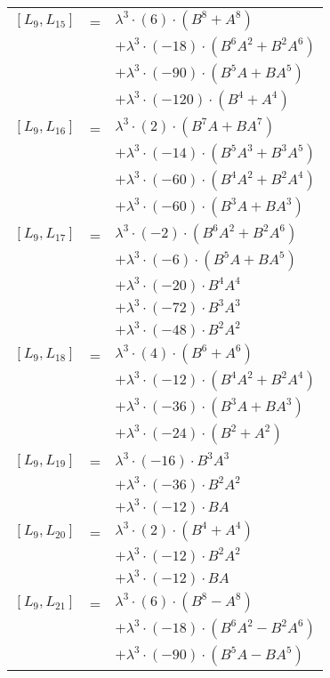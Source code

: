 \documentclass{article}
\begin{document}
\begin{center}
\begin{longtable}{lll}
$[L_{9},L_{15}]$ & = & ${\lambda}^3{\cdot}(6){\cdot}(B^{8}+A^{8})$ \\*
 & & $ + {\lambda}^3{\cdot}(-18){\cdot}(B^{6}A^{2}+B^{2}A^{6})$ \\*
 & & $ + {\lambda}^3{\cdot}(-90){\cdot}(B^{5}A+BA^{5})$ \\*
 & & $ + {\lambda}^3{\cdot}(-120){\cdot}(B^{4}+A^{4})$ \\
$[L_{9},L_{16}]$ & = & ${\lambda}^3{\cdot}(2){\cdot}(B^{7}A+BA^{7})$ \\*
 & & $ + {\lambda}^3{\cdot}(-14){\cdot}(B^{5}A^{3}+B^{3}A^{5})$ \\*
 & & $ + {\lambda}^3{\cdot}(-60){\cdot}(B^{4}A^{2}+B^{2}A^{4})$ \\*
 & & $ + {\lambda}^3{\cdot}(-60){\cdot}(B^{3}A+BA^{3})$ \\
$[L_{9},L_{17}]$ & = & ${\lambda}^3{\cdot}(-2){\cdot}(B^{6}A^{2}+B^{2}A^{6})$ \\*
 & & $ + {\lambda}^3{\cdot}(-6){\cdot}(B^{5}A+BA^{5})$ \\*
 & & $ + {\lambda}^3{\cdot}(-20){\cdot}B^{4}A^{4}$ \\*
 & & $ + {\lambda}^3{\cdot}(-72){\cdot}B^{3}A^{3}$ \\*
 & & $ + {\lambda}^3{\cdot}(-48){\cdot}B^{2}A^{2}$ \\
$[L_{9},L_{18}]$ & = & ${\lambda}^3{\cdot}(4){\cdot}(B^{6}+A^{6})$ \\*
 & & $ + {\lambda}^3{\cdot}(-12){\cdot}(B^{4}A^{2}+B^{2}A^{4})$ \\*
 & & $ + {\lambda}^3{\cdot}(-36){\cdot}(B^{3}A+BA^{3})$ \\*
 & & $ + {\lambda}^3{\cdot}(-24){\cdot}(B^{2}+A^{2})$ \\
$[L_{9},L_{19}]$ & = & ${\lambda}^3{\cdot}(-16){\cdot}B^{3}A^{3}$ \\*
 & & $ + {\lambda}^3{\cdot}(-36){\cdot}B^{2}A^{2}$ \\*
 & & $ + {\lambda}^3{\cdot}(-12){\cdot}BA$ \\
$[L_{9},L_{20}]$ & = & ${\lambda}^3{\cdot}(2){\cdot}(B^{4}+A^{4})$ \\*
 & & $ + {\lambda}^3{\cdot}(-12){\cdot}B^{2}A^{2}$ \\*
 & & $ + {\lambda}^3{\cdot}(-12){\cdot}BA$ \\
$[L_{9},L_{21}]$ & = & ${\lambda}^3{\cdot}(6){\cdot}(B^{8}-A^{8})$ \\*
 & & $ + {\lambda}^3{\cdot}(-18){\cdot}(B^{6}A^{2}-B^{2}A^{6})$ \\*
 & & $ + {\lambda}^3{\cdot}(-90){\cdot}(B^{5}A-BA^{5})$ \\*

\end{longtable}
\end{center}
\end{document}
